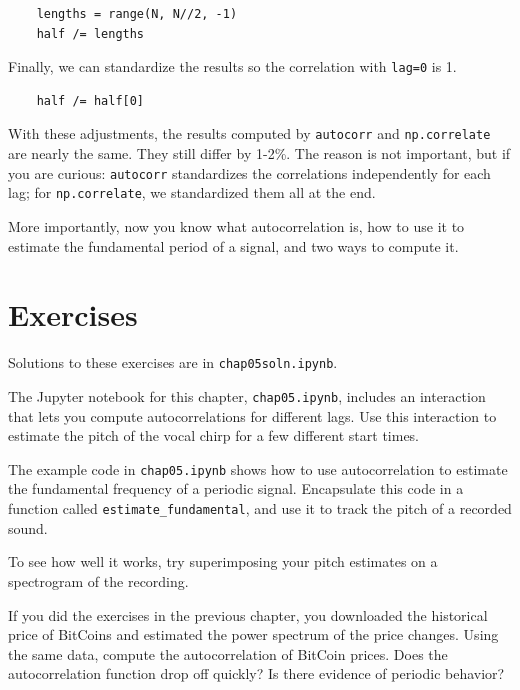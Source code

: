 \documentclass[12pt]{book}
\begin{document}
\begin{verbatim}
    lengths = range(N, N//2, -1)
    half /= lengths
\end{verbatim}

Finally, we can standardize the results so the correlation with
{\tt lag=0} is 1.

\begin{verbatim}
    half /= half[0]
\end{verbatim}

With these adjustments, the results computed by {\tt autocorr} and
{\tt np.correlate} are nearly the same.  They still differ by
1-2\%.  The reason is not important, but if you are curious: {\tt autocorr}
standardizes the correlations independently for each lag; for
{\tt np.correlate}, we standardized them all at the end.

More importantly, now you know what autocorrelation is, how to
use it to estimate the fundamental period of a signal, and two
ways to compute it.


\section{Exercises}

Solutions to these exercises are in {\tt chap05soln.ipynb}.

\begin{exercise}
The Jupyter notebook for this chapter, {\tt chap05.ipynb}, includes
an interaction that lets you compute autocorrelations for different
lags.  Use this interaction to estimate the pitch of the vocal chirp
for a few different start times.
\end{exercise}


\begin{exercise}
The example code in \verb"chap05.ipynb" shows how to use autocorrelation
to estimate the fundamental frequency of a periodic signal.
Encapsulate this code in a function called \verb"estimate_fundamental",
and use it to track the pitch of a recorded sound.

To see how well it works, try superimposing your pitch estimates on a
spectrogram of the recording.
\end{exercise}


\begin{exercise}
If you did the exercises in the previous chapter, you downloaded
the historical price of BitCoins and estimated the power spectrum
of the price changes.  Using the same data, compute the autocorrelation
of BitCoin prices.  Does the autocorrelation function drop off quickly?
Is there evidence of periodic behavior?
\end{exercise}
\end{document}

